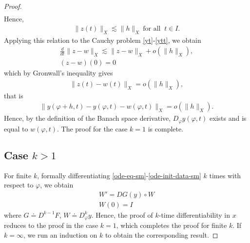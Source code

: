 \documentclass[12pt,reqno]{amsart}
\numberwithin{equation}{section}  %
\newcommand{\vp}{\varphi}
\begin{document}
\begin{proof}
\begin{equation*}
\begin{split}
\end{split}
\end{equation*}
%
%
Hence,
%
%
\begin{equation*}
\begin{split}
\| z(t) \|_{X}  \lesssim  \| h \|_{X}  \ \text{for all } \ t \in I.
\end{split}
\end{equation*}
Applying this relation to the Cauchy problem \eqref{yt}-\eqref{ytt}, we obtain
%
\begin{gather*}
\frac{d}{dt} \| z - w \|_{X} \lesssim  \| z - w \|_{X}  + o(\| h \|_{X}),
\\
(z-w)(0) = 0
\end{gather*}
which by Gronwall's inequality gives
%
%
%
%
%
%
%
\begin{equation*}
\begin{split}
\| z(t) - w(t) \|_{X} 
= o(\| h \|_{X}),
\end{split}
\end{equation*}
%
%
that is
%
%
\begin{equation*}
\begin{split}
\| y(\vp + h, t) - y(\vp,t) - w(\vp,t) \|_{X} = o(\| h \|_{X}).
\end{split}
\end{equation*}
%
%
Hence, by the definition of the Banach space derivative, $D_{\vp}y(\vp,t)$
exists and is equal to $w(\vp,t)$. The proof for the case $k=1$ is complete.
\subsection*{Case $k >1$} 
\label{ssec:case-kg1}
For finite $k$, formally differentiating
\eqref{ode-eq-sm}-\eqref{ode-init-data-sm}
$k$ times with respect to $\vp$, we obtain
\begin{gather*}
W' = DG(y) \circ W
\\
W(0) = I
\end{gather*}
where $G \doteq D^{k-1}F$, $W \doteq D_{\vp}^{k} y$. Hence, the proof of
$k$-time differentiability in $x$ reduces to the proof in the case $k=1$, which
completes the proof for finite $k$. If $k = \infty$, we run an induction on $k$ to
obtain the corresponding result.
\end{proof}
%
%
%
%
%
%
%
\end{document}
